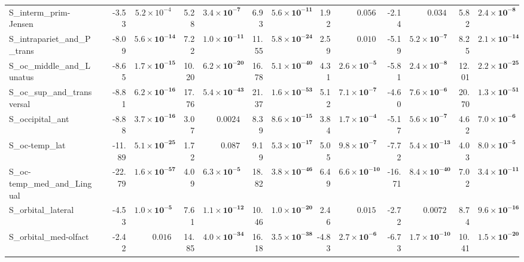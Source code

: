 {\begin{longtable}{llrrrrrrrrrrrr}
S\_interm\_prim-Jensen &  & -3.53 & $5.2{\times}10^{-4}$ & 5.28 & $\mathbf{3.4{\times}10^{-7}}$ & 6.93 & $\mathbf{5.6{\times}10^{-11}}$ & 1.92 & $0.056$ & -2.14 & $0.034$ & 5.82 & $\mathbf{2.4{\times}10^{-8}}$ \\
S\_intrapariet\_and\_P\_trans &  & -8.09 & $\mathbf{5.6{\times}10^{-14}}$ & 7.22 & $\mathbf{1.0{\times}10^{-11}}$ & 11.55 & $\mathbf{5.8{\times}10^{-24}}$ & 2.59 & $0.010$ & -5.19 & $\mathbf{5.2{\times}10^{-7}}$ & 8.25 & $\mathbf{2.1{\times}10^{-14}}$ \\
S\_oc\_middle\_and\_Lunatus &  & -8.65 & $\mathbf{1.7{\times}10^{-15}}$ & 10.20 & $\mathbf{6.2{\times}10^{-20}}$ & 16.78 & $\mathbf{5.1{\times}10^{-40}}$ & 4.31 & $\mathbf{2.6{\times}10^{-5}}$ & -5.81 & $\mathbf{2.4{\times}10^{-8}}$ & 12.01 & $\mathbf{2.2{\times}10^{-25}}$ \\
S\_oc\_sup\_and\_transversal &  & -8.81 & $\mathbf{6.2{\times}10^{-16}}$ & 17.76 & $\mathbf{5.4{\times}10^{-43}}$ & 21.37 & $\mathbf{1.6{\times}10^{-53}}$ & 5.12 & $\mathbf{7.1{\times}10^{-7}}$ & -4.60 & $\mathbf{7.6{\times}10^{-6}}$ & 20.70 & $\mathbf{1.3{\times}10^{-51}}$ \\
S\_occipital\_ant &  & -8.88 & $\mathbf{3.7{\times}10^{-16}}$ & 3.07 & $0.0024$ & 8.39 & $\mathbf{8.6{\times}10^{-15}}$ & 3.84 & $\mathbf{1.7{\times}10^{-4}}$ & -5.17 & $\mathbf{5.6{\times}10^{-7}}$ & 4.62 & $\mathbf{7.0{\times}10^{-6}}$ \\
S\_oc-temp\_lat &  & -11.89 & $\mathbf{5.1{\times}10^{-25}}$ & 1.72 & $0.087$ & 9.19 & $\mathbf{5.3{\times}10^{-17}}$ & 5.05 & $\mathbf{9.8{\times}10^{-7}}$ & -7.72 & $\mathbf{5.4{\times}10^{-13}}$ & 4.03 & $\mathbf{8.0{\times}10^{-5}}$ \\
S\_oc-temp\_med\_and\_Lingual &  & -22.79 & $\mathbf{1.6{\times}10^{-57}}$ & 4.09 & $\mathbf{6.3{\times}10^{-5}}$ & 18.82 & $\mathbf{3.8{\times}10^{-46}}$ & 6.49 & $\mathbf{6.6{\times}10^{-10}}$ & -16.71 & $\mathbf{8.4{\times}10^{-40}}$ & 7.02 & $\mathbf{3.4{\times}10^{-11}}$ \\
S\_orbital\_lateral &  & -4.53 & $\mathbf{1.0{\times}10^{-5}}$ & 7.61 & $\mathbf{1.1{\times}10^{-12}}$ & 10.46 & $\mathbf{1.0{\times}10^{-20}}$ & 2.46 & $0.015$ & -2.72 & $0.0072$ & 8.74 & $\mathbf{9.6{\times}10^{-16}}$ \\
S\_orbital\_med-olfact &  & -2.42 & $0.016$ & 14.85 & $\mathbf{4.0{\times}10^{-34}}$ & 16.18 & $\mathbf{3.5{\times}10^{-38}}$ & -4.83 & $\mathbf{2.7{\times}10^{-6}}$ & -6.73 & $\mathbf{1.7{\times}10^{-10}}$ & 10.41 & $\mathbf{1.5{\times}10^{-20}}$ \\

\end{longtable}}
